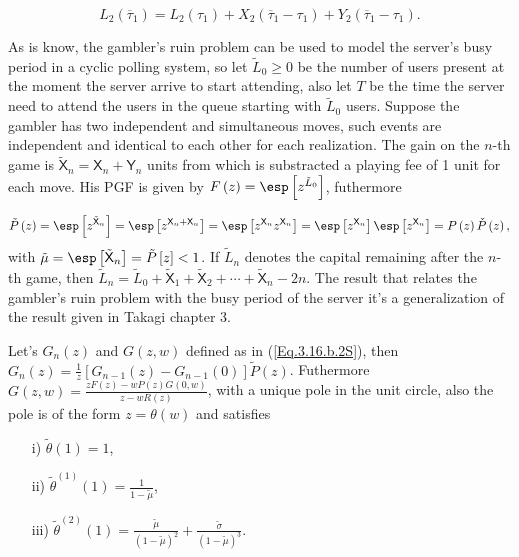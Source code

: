 \begin{equation}\label{Eq.UsuariosTotalesZ2}
L_{2}\left(\overline{\tau}_{1}\right)=L_{2}\left(\tau_{1}\right)+X_{2}\left(\overline{\tau}_{1}-\tau_{1}\right)+Y_{2}\left(\overline{\tau}_{1}-\tau_{1}\right).
\end{equation}

As is know, the gambler's ruin problem can be used to model the server's busy period in a cyclic polling system, so let $\tilde{L}_{0}\geq0$ be the number of users present at the moment the server arrive to start attending, also let $T$ be the time the server need to attend the users in the queue starting with $\tilde{L}_{0}$ users. Suppose the gambler has two independent and simultaneous moves, such events are independent and identical to each other for each realization. The gain on the $n$-th game is $\tilde{\mathsf{X}}_{n}=\mathsf{X}_{n}+\mathsf{Y}_{n}$ units from which is substracted a playing fee of 1 unit for each move. His PGF is given by $F\left(z\right)=\esp\left[z^{\tilde{L}_{0}}\right]$, futhermore

$$\tilde{P}\left(z\right)=\esp\left[z^{\tilde{\mathsf{X}}_{n}}\right]=\esp\left[z^{\mathsf{X}_{n}+\mathsf{X}_{n}}\right]=\esp\left[z^{\mathsf{X}_{n}}z^{\mathsf{X}_{n}}\right]=\esp\left[z^{\mathsf{X}_{n}}\right]\esp\left[z^{\mathsf{X}_{n}}\right]=P\left(z\right)\check{P}\left(z\right),$$ with $\tilde{\mu}=\esp\left[\tilde{\mathsf{X}}_{n}\right]=\tilde{P}\left[z\right]<1$. If  $\tilde{L}_{n}$ denotes the capital remaining after the $n$-th game, then $\tilde{L}_{n}=\tilde{L}_{0}+\tilde{\mathsf{X}}_{1}+\tilde{\mathsf{X}}_{2}+\cdots+\tilde{\mathsf{X}}_{n}-2n$. The result that relates the gambler's ruin problem with the busy period of the server it's a generalization of the result given in Takagi \cite{Takagi} chapter 3.

\begin{Prop}
Let's $G_{n}\left(z\right)$ and $G\left(z,w\right)$ defined as in 
(\ref{Eq.3.16.b.2S}), then $G_{n}\left(z\right)=\frac{1}{z}\left[G_{n-1}\left(z\right)-G_{n-1}\left(0\right)\right]\tilde{P}\left(z\right)$. Futhermore $G\left(z,w\right)=\frac{zF\left(z\right)-wP\left(z\right)G\left(0,w\right)}{z-wR\left(z\right)}$, with a unique pole in the unit circle, also the pole is of the form $z=\theta\left(w\right)$ and satisfies 
\begin{multicols}{3}
\begin{itemize}
\item[i)]$\tilde{\theta}\left(1\right)=1$,

\item[ii)] $\tilde{\theta}^{(1)}\left(1\right)=\frac{1}{1-\tilde{\mu}}$,

\item[iii)]
$\tilde{\theta}^{(2)}\left(1\right)=\frac{\tilde{\mu}}{\left(1-\tilde{\mu}\right)^{2}}+\frac{\tilde{\sigma}}{\left(1-\tilde{\mu}\right)^{3}}$.
\end{itemize}
\end{multicols}
\end{Prop}
%
